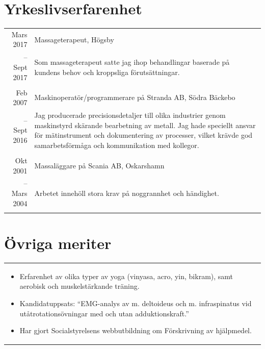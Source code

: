 \documentclass[11pt,a4paper]{article}
\begin{document}
\section{Yrkeslivserfarenhet}
\begin{tabularx}{\textwidth}{r|X}	
	Mars 2017 & Massageterapeut, Högsby \\
	-- Sept 2017 &\footnotesize{Som massageterapeut satte jag ihop behandlingar baserade på kundens behov och kroppsliga förutsättningar. }\\
	\multicolumn{2}{c}{} \\

	Feb 2007 & Maskinoperatör/programmerare på Stranda AB, Södra Bäckebo \\
	-- Sept 2016&\footnotesize{Jag producerade precisionsdetaljer till olika industrier genom maskinstyrd skärande bearbetning av metall. Jag hade speciellt ansvar för mätinstrument och dokumentering av processer, vilket krävde god samarbetsförmåga och kommunikation med kollegor.}\\
	\multicolumn{2}{c}{} \\
	
	Okt 2001& Massaläggare på Scania AB, Oskarshamn \\
	-- Mars 2004&\footnotesize{Arbetet innehöll stora krav på noggrannhet och händighet.}\\
	\multicolumn{2}{c}{} \\

\end{tabularx}

\section{Övriga meriter}
\begin{tabularx}{\textwidth}{X}
	\vspace{-7pt}
\begin{itemize}[leftmargin=0.8em] 
	\item Erfarenhet av olika typer av yoga (vinyasa, acro, yin, bikram), samt aerobisk och muskelstärkande träning.
	\item Kandidatuppsats: ``EMG-analys av m. deltoideus och m. infraspinatus vid utåt\-rotations\-övningar med och utan adduktionskraft.''
	\item Har gjort Socialstyrelsens webbutbildning om Förskrivning av hjälpmedel.
\end{itemize}
\end{tabularx}
\end{document}
